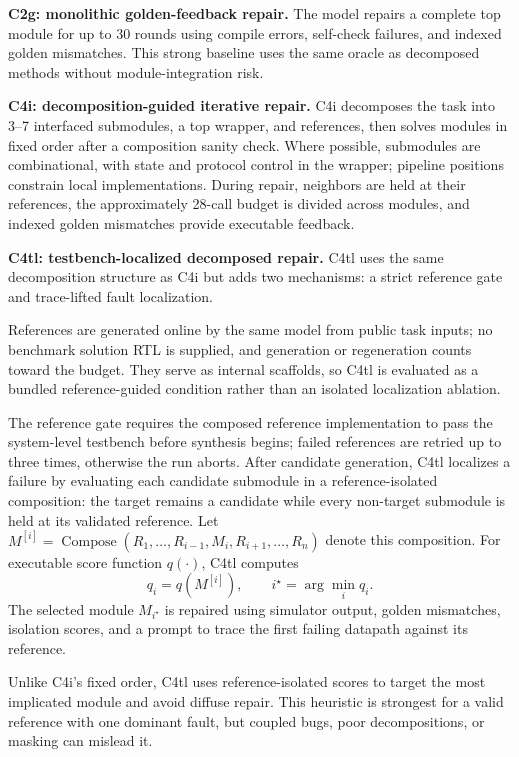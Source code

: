 \documentclass[sigconf,anonymous]{acmart}
\newcommand{\cTwoG}{C2g\xspace}
\newcommand{\cFourI}{C4i\xspace}
\newcommand{\cFourTL}{C4tl\xspace}
\begin{document}
\textbf{\cTwoG: monolithic golden-feedback repair.}
The model repairs a complete top module for up to 30 rounds using compile errors, self-check failures, and indexed golden mismatches.
This strong baseline uses the same oracle as decomposed methods without module-integration risk.

\textbf{\cFourI: decomposition-guided iterative repair.}
\cFourI decomposes the task into 3--7 interfaced submodules, a top wrapper, and references, then solves modules in fixed order after a composition sanity check.
Where possible, submodules are combinational, with state and protocol control in the wrapper; pipeline positions constrain local implementations.
During repair, neighbors are held at their references, the approximately 28-call budget is divided across modules, and indexed golden mismatches provide executable feedback.

\textbf{\cFourTL: testbench-localized decomposed repair.}
\cFourTL uses the same decomposition structure as \cFourI but adds two mechanisms: a strict reference gate and trace-lifted fault localization.

References are generated online by the same model from public task inputs; no benchmark solution RTL is supplied, and generation or regeneration counts toward the budget.
They serve as internal scaffolds, so \cFourTL is evaluated as a bundled reference-guided condition rather than an isolated localization ablation.

The reference gate requires the composed reference implementation to pass the system-level testbench before synthesis begins; failed references are retried up to three times, otherwise the run aborts.
After candidate generation, \cFourTL localizes a failure by evaluating each candidate submodule in a reference-isolated composition: the target remains a candidate while every non-target submodule is held at its validated reference.
Let $M^{[i]}=\operatorname{Compose}(R_1,\ldots,R_{i-1},M_i,R_{i+1},\ldots,R_n)$ denote this composition.
For executable score function $q(\cdot)$, \cFourTL computes
\begingroup
\setlength{\abovedisplayskip}{3pt}
\setlength{\belowdisplayskip}{3pt}
\setlength{\abovedisplayshortskip}{3pt}
\setlength{\belowdisplayshortskip}{3pt}
\[
q_i = q(M^{[i]}), \qquad
i^\star = \arg\min_i q_i .
\]
\endgroup
The selected module $M_{i^\star}$ is repaired using simulator output, golden mismatches, isolation scores, and a prompt to trace the first failing datapath against its reference.

Unlike \cFourI's fixed order, \cFourTL uses reference-isolated scores to target the most implicated module and avoid diffuse repair.
This heuristic is strongest for a valid reference with one dominant fault, but coupled bugs, poor decompositions, or masking can mislead it.
\end{document}
